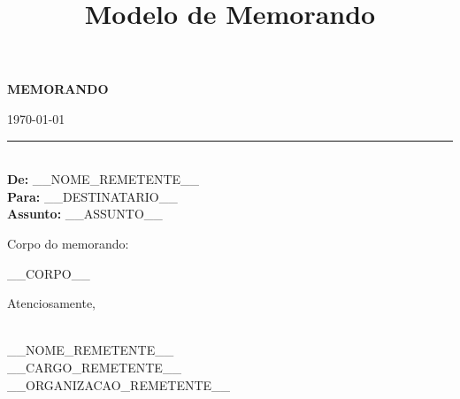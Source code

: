 \documentclass[a4paper,12pt]{article}
\title{Modelo de Memorando}
\author{}
\date{}
\begin{document}
\begin{center}
    \textbf{MEMORANDO}
\end{center}

\bigskip

\begin{flushright}
    \today \\
    \rule{5cm}{0.4pt} \\
    \textbf{De:} __NOME_REMETENTE__ \\
    \textbf{Para:} __DESTINATARIO__ \\
    \textbf{Assunto:} __ASSUNTO__
\end{flushright}

\bigskip

Corpo do memorando:

\bigskip

__CORPO__

\bigskip

Atenciosamente,

\bigskip

\hrulefill \\
__NOME_REMETENTE__ \\
__CARGO_REMETENTE__ \\
__ORGANIZACAO_REMETENTE__
\end{document}
